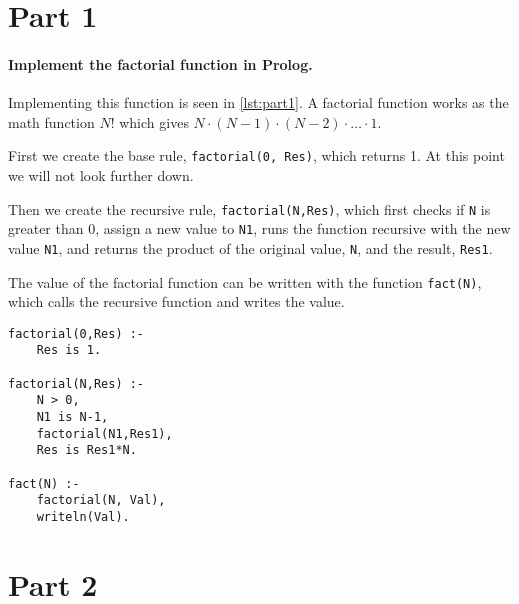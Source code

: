 \documentclass[Main]{subfiles}
\begin{document}
\section*{Part 1}
\paragraph{Implement the factorial function in Prolog.}

Implementing this function is seen in \codeTitle \ref{lst:part1}.
A factorial function works as the math function $N!$ which gives $N \cdot (N-1) \cdot (N-2) \cdot \ldots \cdot 1$.

First we create the base rule, \texttt{factorial(0, Res)}, which returns 1. 
At this point we will not look further down.

Then we create the recursive rule, \texttt{factorial(N,Res)}, which first checks if \texttt{N} is greater than 0, assign a new value to \texttt{N1}, runs the function recursive with the new value \texttt{N1}, and returns the product of the original value, \texttt{N}, and the result, \texttt{Res1}.

The value of the factorial function can be written with the function \texttt{fact(N)}, which calls the recursive function and writes the value.

\begin{lstlisting}[caption=Fatorial function in Prolog, style=Code-Prolog, label=lst:part1]
factorial(0,Res) :-
    Res is 1.

factorial(N,Res) :-
    N > 0,
    N1 is N-1,
    factorial(N1,Res1),
    Res is Res1*N.

fact(N) :-
	factorial(N, Val),
	writeln(Val).
\end{lstlisting}


\newpage
\section*{Part 2}
\end{document}
